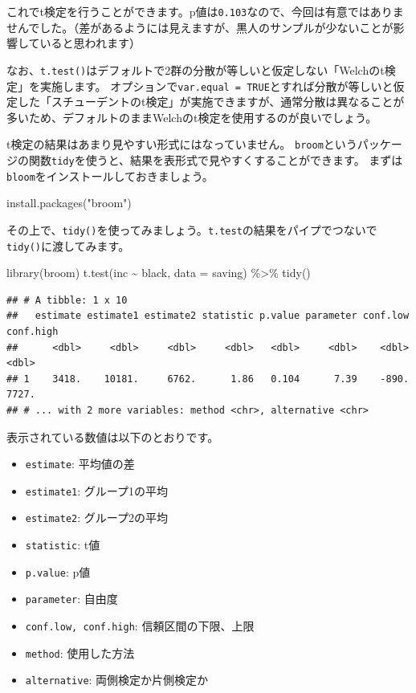 \documentclass[
]{book}
\newenvironment{Shaded}{\begin{snugshade}}{\end{snugshade}}
\newcommand{\AttributeTok}[1]{\textcolor[rgb]{0.77,0.63,0.00}{#1}}
\newcommand{\FunctionTok}[1]{\textcolor[rgb]{0.00,0.00,0.00}{#1}}
\newcommand{\NormalTok}[1]{#1}
\newcommand{\SpecialCharTok}[1]{\textcolor[rgb]{0.00,0.00,0.00}{#1}}
\newcommand{\StringTok}[1]{\textcolor[rgb]{0.31,0.60,0.02}{#1}}
\providecommand{\tightlist}{%
  \setlength{\itemsep}{0pt}\setlength{\parskip}{0pt}}
\begin{document}
これでt検定を行うことができます。p値は\texttt{0.103}なので、今回は有意ではありませんでした。（差があるようには見えますが、黒人のサンプルが少ないことが影響していると思われます）

なお、\texttt{t.test()}はデフォルトで2群の分散が等しいと仮定しない「Welchのt検定」を実施します。
オプションで\texttt{var.equal\ =\ TRUE}とすれば分散が等しいと仮定した「スチューデントのt検定」が実施できますが、通常分散は異なることが多いため、デフォルトのままWelchのt検定を使用するのが良いでしょう。

t検定の結果はあまり見やすい形式にはなっていません。
\texttt{broom}というパッケージの関数\texttt{tidy}を使うと、結果を表形式で見やすくすることができます。
まずは\texttt{bloom}をインストールしておきましょう。

\begin{Shaded}
\begin{Highlighting}[]
\FunctionTok{install.packages}\NormalTok{(}\StringTok{"broom"}\NormalTok{)}
\end{Highlighting}
\end{Shaded}

その上で、\texttt{tidy()}を使ってみましょう。\texttt{t.test}の結果をパイプでつないで\texttt{tidy()}に渡してみます。

\begin{Shaded}
\begin{Highlighting}[]
\FunctionTok{library}\NormalTok{(broom)}
\FunctionTok{t.test}\NormalTok{(inc }\SpecialCharTok{\textasciitilde{}}\NormalTok{ black, }\AttributeTok{data =}\NormalTok{ saving) }\SpecialCharTok{\%\textgreater{}\%}
  \FunctionTok{tidy}\NormalTok{()}
\end{Highlighting}
\end{Shaded}

\begin{verbatim}
## # A tibble: 1 x 10
##   estimate estimate1 estimate2 statistic p.value parameter conf.low conf.high
##      <dbl>     <dbl>     <dbl>     <dbl>   <dbl>     <dbl>    <dbl>     <dbl>
## 1    3418.    10181.     6762.      1.86   0.104      7.39    -890.     7727.
## # ... with 2 more variables: method <chr>, alternative <chr>
\end{verbatim}

表示されている数値は以下のとおりです。

\begin{itemize}
\tightlist
\item
  \texttt{estimate}: 平均値の差
\item
  \texttt{estimate1}: グループ1の平均
\item
  \texttt{estimate2}: グループ2の平均
\item
  \texttt{statistic}: t値
\item
  \texttt{p.value}: p値
\item
  \texttt{parameter}: 自由度
\item
  \texttt{conf.low,\ conf.high}: 信頼区間の下限、上限
\item
  \texttt{method}: 使用した方法
\item
  \texttt{alternative}: 両側検定か片側検定か
\end{itemize}
\end{document}
